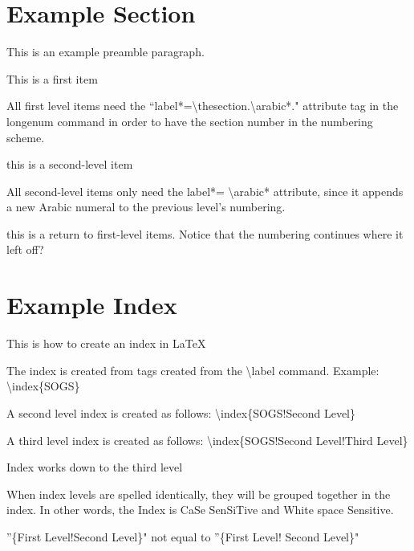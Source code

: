 \section{Example Section}

This is an example preamble paragraph.  

 \begin{longenum}[ label*=\thesection.\arabic*., align=left]
 \item This is a first item
 \item All first level items need the ``label*=\textbackslash thesection.\textbackslash arabic*." attribute tag in the longenum command in order to have the section number in the numbering scheme.  
  \begin{longenum}[ label*=\arabic*., align=left]
  \item this is a second-level item
  \item All second-level items only need the label*= \textbackslash arabic* attribute, since it appends a new Arabic numeral to the previous level's numbering. 
  \end{longenum}
  \item this is a return to first-level items.  Notice that the numbering continues where it left off?
  \end{longenum}
  
\section{Example Index}
 \begin{longenum}[ label*=\thesection.\arabic*., align=left]
 \item This is how to create an index in \LaTeX
 \item The index is created from tags created from the \textbackslash label command. Example: \textbackslash index\{SOGS\}
 \item A second level index is created as follows:  \textbackslash index\{SOGS!Second Level\}
 \item A third level index is created as follows:  \textbackslash index\{SOGS!Second Level!Third Level\}
 \item Index works down to the third level
 \item When index levels are spelled identically, they will be grouped together in the index.  In other words, the Index is CaSe SenSiTive and White space Sensitive.
\item ''\{First Level!Second Level\}" not equal to ''\{First Level! Second Level\}"  
   \end{longenum}